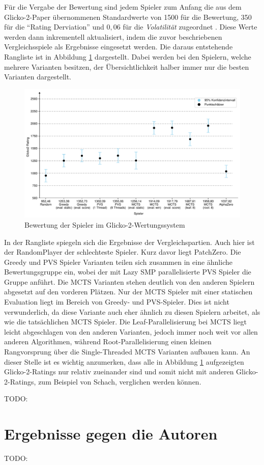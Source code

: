 Für die Vergabe der Bewertung sind jedem Spieler zum Anfang die aus dem Glicko-2-Paper übernommenen Standardwerte von 1500 für die Bewertung, 350 für die \enquote{Rating Derviation} und $0{,}06$ für die \emph{Volatilität} zugeordnet \cite[S. 2]{2022.Glicko2}. Diese Werte werden dann inkrementell aktualisiert, indem die zuvor beschriebenen Vergleichsspiele als Ergebnisse eingesetzt werden. Die daraus entstehende Rangliste ist in Abbildung \ref{fig:player-ratings} dargestellt. Dabei werden bei den Spielern, welche mehrere Varianten besitzen, der Übersichtlichkeit halber immer nur die besten Varianten dargestellt.

\begin{figure}[!ht]
    \centering
    \includegraphics[width=\textwidth]{res/pictures/plots/player-ratings.pdf}
    \caption{Bewertung der Spieler im Glicko-2-Wertungssystem}
    \label{fig:player-ratings}
\end{figure}

In der Rangliste spiegeln sich die Ergebnisse der Vergleichspartien. Auch hier ist der RandomPlayer der schlechteste Spieler. Kurz davor liegt PatchZero. Die Greedy und \ac{PVS} Spieler Varianten teilen sich zusammen in eine ähnliche Bewertungsgruppe ein, wobei der mit Lazy \ac{SMP} parallelisierte \ac{PVS} Spieler die Gruppe anführt. Die \ac{MCTS} Varianten stehen deutlich von den anderen Spielern abgesetzt auf den vorderen Plätzen. Nur der \ac{MCTS} Spieler mit einer statischen Evaluation liegt im Bereich von Greedy- und \ac{PVS}-Spieler. Dies ist nicht verwunderlich, da diese Variante auch eher ähnlich zu diesen Spielern arbeitet, als wie die tatsächlichen \ac{MCTS} Spieler. Die Leaf-Parallelisierung bei \ac{MCTS} liegt leicht abgeschlagen von den anderen Varianten, jedoch immer noch weit vor allen anderen Algorithmen, während Root-Parallelisierung einen kleinen Rangvorsprung über die Single-Threaded \ac{MCTS} Varianten aufbauen kann. An dieser Stelle ist es wichtig anzumerken, dass alle in Abbildung \ref{fig:player-ratings} aufgezeigten Glicko-2-Ratings nur relativ zueinander sind und somit nicht mit anderen Glicko-2-Ratings, zum Beispiel von Schach, verglichen werden können.

TODO:

\section{Ergebnisse gegen die Autoren}

TODO: